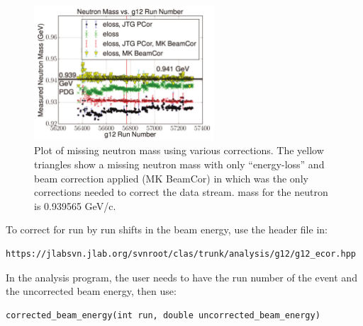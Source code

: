 \begin{figure}\begin{center}
\includegraphics[width=0.6\textwidth]{figures/calib/tag/ecor/C3pi_allcorr_neutron_rxr.pdf}
\caption[Corrected Missing Neutron Mass for  Using Beam Corrections]{\label{fig:neutron.fixall} Plot of missing neutron mass using various corrections. The yellow triangles show a missing neutron mass with only ``energy-loss'' and beam correction applied (MK BeamCor) in which was the only corrections needed to correct the  data stream.  mass for the neutron is 0.939565 GeV/c.}
\end{center}\end{figure}



To correct for run by run shifts in the beam energy, use the header file in:
\begin{verbatim}
https://jlabsvn.jlab.org/svnroot/clas/trunk/analysis/g12/g12_ecor.hpp
\end{verbatim}

In the analysis program, the user needs to have the run number of the event and the uncorrected beam energy, then use:
\begin{verbatim}
corrected_beam_energy(int run, double uncorrected_beam_energy)
\end{verbatim}


\FloatBarrier
